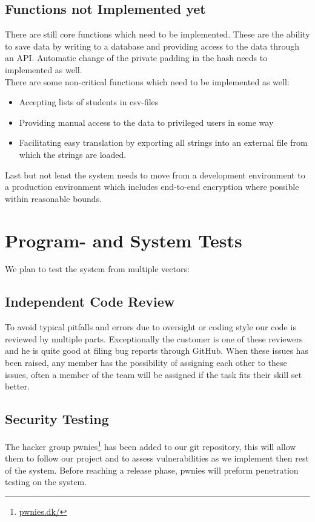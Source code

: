 \documentclass[11pt,a4paper]{report}
\begin{document}
\subsection{Functions not Implemented yet}
There are still core functions which need to be implemented. These are the ability to save data by writing to a database and providing access to the data through an API. Automatic change of the private padding in the hash needs to implemented as well. \\
There are some non-critical functions which need to be implemented as well:
\begin{itemize}
    \item Accepting lists of students in csv-files
    \item Providing manual access to the data to privileged users in some way
    \item Facilitating easy translation by exporting all strings into an external file from which the strings are loaded.
\end{itemize}
Last but not least the system needs to move from a development environment to a production environment which includes end-to-end encryption where possible within reasonable bounds.

\section{Program- and System Tests}\label{sec:Program_systemtests}
We plan to test the system from multiple vectors:
\subsection{Independent Code Review}
To avoid typical pitfalls and errors due to oversight or coding style our code is reviewed by multiple parts. Exceptionally the customer is one of these reviewers and he is quite good at filing bug reports through GitHub.
 When these issues has been raised, any member has the possibility of assigning each other to these issues, often a member of the team will be assigned if the task fits their skill set better.
\subsection{Security Testing}

The hacker group pwnies\footnote{\href{https://pwnies.dk/}{pwnies.dk/}} has been added to our git repository, this will allow them to follow our project and to assess vulnerabilities as  we implement then rest of the system. Before reaching a release phase, pwnies will preform penetration testing on the system.\cite{wiki:sectest}
\end{document}
